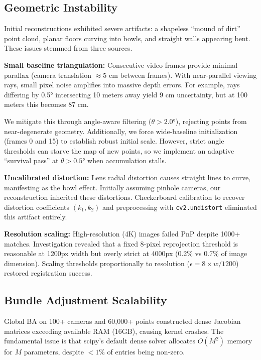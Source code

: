 \documentclass[10pt,twocolumn,letterpaper]{article}
\begin{document}
\subsection{Geometric Instability}

Initial reconstructions exhibited severe artifacts: a shapeless ``mound of dirt'' point cloud, planar floors curving into bowls, and straight walls appearing bent. These issues stemmed from three sources.

\textbf{Small baseline triangulation:} Consecutive video frames provide minimal parallax (camera translation $\approx 5$ cm between frames). With near-parallel viewing rays, small pixel noise amplifies into massive depth errors. For example, rays differing by 0.5° intersecting 10 meters away yield 9 cm uncertainty, but at 100 meters this becomes 87 cm.

We mitigate this through angle-aware filtering ($\theta > 2.0°$), rejecting points from near-degenerate geometry. Additionally, we force wide-baseline initialization (frames 0 and 15) to establish robust initial scale. However, strict angle thresholds can starve the map of new points, so we implement an adaptive ``survival pass'' at $\theta > 0.5°$ when accumulation stalls.

\textbf{Uncalibrated distortion:} Lens radial distortion causes straight lines to curve, manifesting as the bowl effect. Initially assuming pinhole cameras, our reconstruction inherited these distortions. Checkerboard calibration to recover distortion coefficients $(k_1, k_2)$ and preprocessing with \texttt{cv2.undistort} eliminated this artifact entirely.

\textbf{Resolution scaling:} High-resolution (4K) images failed PnP despite 1000+ matches. Investigation revealed that a fixed 8-pixel reprojection threshold is reasonable at 1200px width but overly strict at 4000px (0.2\% vs 0.7\% of image dimension). Scaling thresholds proportionally to resolution ($\epsilon = 8 \times w/1200$) restored registration success.

\subsection{Bundle Adjustment Scalability}

Global BA on 100+ cameras and 60,000+ points constructed dense Jacobian matrices exceeding available RAM (16GB), causing kernel crashes. The fundamental issue is that scipy's default dense solver allocates $O(M^2)$ memory for $M$ parameters, despite $<1\%$ of entries being non-zero.
\end{document}
